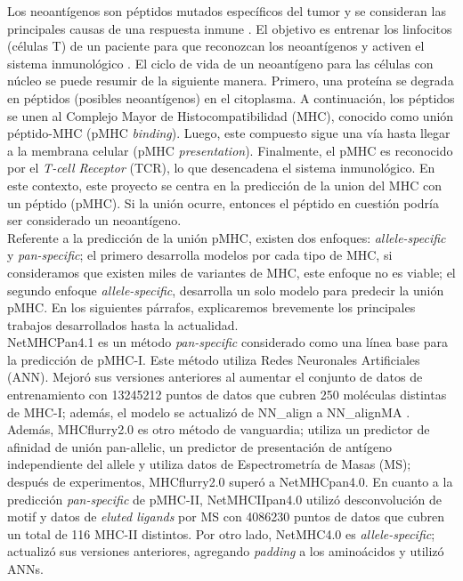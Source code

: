 \documentclass[a4paper]{article}
\begin{document}
Los neoantígenos son péptidos mutados específicos del tumor y se consideran las principales causas de una respuesta inmune \citep{borden2022cancer,chen2021challenges,gopanenko2020main}. El objetivo es entrenar los linfocitos (células T) de un paciente para que reconozcan los neoantígenos y activen el sistema inmunológico \citep{de2020neoantigen,peng2019neoantigen}. El ciclo de vida de un neoantígeno para las células con núcleo se puede resumir de la siguiente manera. Primero, una proteína se degrada en péptidos (posibles neoantígenos) en el citoplasma. A continuación, los péptidos se unen al Complejo Mayor de Histocompatibilidad (MHC), conocido como unión péptido-MHC (pMHC \textit{binding}). Luego, este compuesto sigue una vía hasta llegar a la membrana celular (pMHC \textit{presentation}). Finalmente, el pMHC es reconocido por el \textit{T-cell Receptor} (TCR), lo que desencadena el sistema inmunológico. En este contexto, este proyecto se centra en la predicción de la union del MHC con un péptido (pMHC). Si la unión ocurre, entonces el péptido en cuestión podría ser considerado un neoantígeno. \\



Referente a la 	predicción de la unión pMHC, existen dos enfoques: \textit{allele-specific} y \textit{pan-specific}; el primero desarrolla modelos por cada tipo de MHC, si consideramos que existen miles de variantes de MHC, este enfoque no es viable; el segundo enfoque \textit{allele-specific}, desarrolla un solo modelo para predecir la unión pMHC. En los siguientes párrafos, explicaremos brevemente los principales trabajos desarrollados hasta la actualidad.\\
	
	NetMHCPan4.1 \citep{reynisson2020netmhcpan} es un método 	\textit{pan-specific} considerado como una línea base para la predicción de pMHC-I. Este método utiliza Redes Neuronales Artificiales (ANN). Mejoró sus versiones anteriores al aumentar el conjunto de datos de entrenamiento con 13245212 puntos de datos que cubren 250 moléculas distintas de MHC-I; además, el modelo se actualizó de NN\_align a NN\_alignMA \citep{alvarez2019nnalign_ma}. Además, MHCflurry2.0 \citep{o2020mhcflurry} es otro método de vanguardia; utiliza un predictor de afinidad de unión pan-allelic, un predictor de presentación de antígeno independiente del allele y utiliza datos de Espectrometría de Masas (MS); después de experimentos, MHCflurry2.0 superó a NetMHCpan4.0. En cuanto a la predicción \textit{pan-specific} de pMHC-II, NetMHCIIpan4.0 \citep{reynisson2020netmhcpan} utilizó desconvolución de motif y datos de \textit{eluted ligands} por MS con 4086230 puntos de datos que cubren un total de 116 MHC-II distintos. Por otro lado, NetMHC4.0 \citep{andreatta2016gapped} es \textit{allele-specific}; actualizó sus versiones anteriores, agregando \textit{padding} a los aminoácidos y utilizó ANNs. \\
\end{document}

